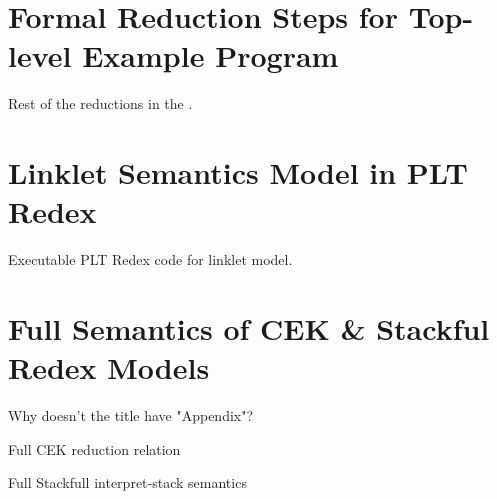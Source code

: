 \begin{appendices}
\chapter[\texorpdfstring{Formal Reduction Steps for Top-level Example Program}{Appendix B}]{Formal Reduction Steps for Top-level Example Program}
\label{appendix:formal-reduction-steps-toplevel-example}

    \begin{figure-here}
        Rest of the reductions in the .
    \end{figure-here}

\chapter[\texorpdfstring{Linklet Semantics Model in PLT Redex}{Appendix C}]{Linklet Semantics Model in PLT Redex}
\label{appendix:linklet-semantics-model-redex-code}

    \begin{figure-here}
        Executable PLT Redex code for linklet model.
    \end{figure-here}

\chapter[\texorpdfstring{Full Semantics of CEK \& Stackful Redex Models}
                          {Appendix D}]{Full Semantics of CEK \& Stackful Redex Models}
\label{appendix:cek-stackful-redex}

    \begin{todo}
        Why doesn't the title have "Appendix"?
    \end{todo}

    \begin{figure-here}
        Full CEK reduction relation
    \end{figure-here}

    \begin{figure-here}
        Full Stackfull interpret-stack semantics
    \end{figure-here}


\end{appendices}